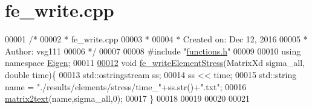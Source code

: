 \hypertarget{fe__write_8cpp_source}{}\section{fe\+\_\+write.\+cpp}
\label{fe__write_8cpp_source}

\begin{DoxyCode}
00001 \textcolor{comment}{/*}
00002 \textcolor{comment}{ * fe\_write.cpp}
00003 \textcolor{comment}{ *}
00004 \textcolor{comment}{ *  Created on: Dec 12, 2016}
00005 \textcolor{comment}{ *      Author: vsg111}
00006 \textcolor{comment}{ */}
00007 
00008 \textcolor{preprocessor}{#include "\hyperlink{functions_8h}{functions.h}"}
00009 
00010 \textcolor{keyword}{using namespace }\hyperlink{namespace_eigen}{Eigen};
00011 
\hyperlink{fe__write_8cpp_a9dec90c41460e15aa1d8dce787683406}{00012} \textcolor{keywordtype}{void} \hyperlink{fe__write_8cpp_a9dec90c41460e15aa1d8dce787683406}{fe\_writeElementStress}(MatrixXd sigma\_all, \textcolor{keywordtype}{double} time)\{
00013     std::ostringstream ss;
00014     ss << time;
00015     std::string name = \textcolor{stringliteral}{"./results/elements/stress/time\_"}+ss.str()+\textcolor{stringliteral}{".txt"};
00016     \hyperlink{functions_8h_a346547477d2a1fbeff6b5e0b05314283}{matrix2text}(name,sigma\_all,0);
00017 \}
00018 
00019 
00020 
00021 
\end{DoxyCode}
